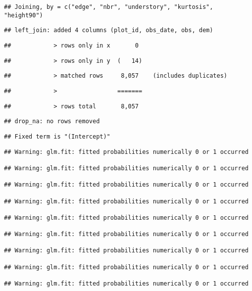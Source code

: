 \documentclass[
]{article}
\begin{document}
\begin{verbatim}
## Joining, by = c("edge", "nbr", "understory", "kurtosis", "height90")
\end{verbatim}

\begin{verbatim}
## left_join: added 4 columns (plot_id, obs_date, obs, dem)
\end{verbatim}

\begin{verbatim}
##            > rows only in x       0
\end{verbatim}

\begin{verbatim}
##            > rows only in y  (   14)
\end{verbatim}

\begin{verbatim}
##            > matched rows     8,057    (includes duplicates)
\end{verbatim}

\begin{verbatim}
##            >                 =======
\end{verbatim}

\begin{verbatim}
##            > rows total       8,057
\end{verbatim}

\begin{verbatim}
## drop_na: no rows removed
\end{verbatim}

\begin{verbatim}
## Fixed term is "(Intercept)"
\end{verbatim}

\begin{verbatim}
## Warning: glm.fit: fitted probabilities numerically 0 or 1 occurred

## Warning: glm.fit: fitted probabilities numerically 0 or 1 occurred

## Warning: glm.fit: fitted probabilities numerically 0 or 1 occurred

## Warning: glm.fit: fitted probabilities numerically 0 or 1 occurred

## Warning: glm.fit: fitted probabilities numerically 0 or 1 occurred

## Warning: glm.fit: fitted probabilities numerically 0 or 1 occurred

## Warning: glm.fit: fitted probabilities numerically 0 or 1 occurred

## Warning: glm.fit: fitted probabilities numerically 0 or 1 occurred

## Warning: glm.fit: fitted probabilities numerically 0 or 1 occurred
\end{verbatim}
\end{document}
